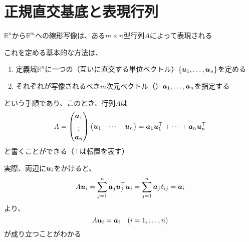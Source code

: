 \documentclass[../../../topic_linear-algebra]{subfiles}
\begin{document}
\sectionline
\section{正規直交基底と表現行列}

$\mathbb{R}^n$から$\mathbb{R}^m$への線形写像は、ある$m \times n$型行列$A$によって表現される

\br

これを定める基本的な方法は、
\begin{enumerate}
  \item 定義域$\mathbb{R}^n$に一つの（互いに直交する単位ベクトル）$\{\vb*{u}_1,\ldots,\vb*{u}_n\}$を定める
  \item それぞれが写像されるべき$m$次元ベクトル（）$\vb*{a}_1,\ldots,\vb*{a}_n$を指定する
\end{enumerate}
という手順であり、このとき、行列$A$は
\begin{equation*}
  A = \begin{pmatrix}
    \vb*{a}_1 \\
    \vdots    \\
    \vb*{a}_n
  \end{pmatrix} \begin{pmatrix}
    \vb*{u}_1 & \cdots & \vb*{u}_n
  \end{pmatrix} = \vb*{a}_1 \vb*{u}_1^\top + \cdots + \vb*{a}_n \vb*{u}_n^\top
\end{equation*}
と書くことができる（$\top$は転置を表す）

\br

実際、両辺に$\vb*{u}_i$をかけると、
\begin{equation*}
  A \vb*{u}_i = \sum_{j=1}^n \vb*{a}_j \vb*{u}_j^\top \vb*{u}_i
  = \sum_{j=1}^n \vb*{a}_j \delta_{ij}
  = \vb*{a}_i
\end{equation*}
より、
\begin{equation*}
  A \vb*{u}_i = \vb*{a}_i \quad (i = 1, \ldots, n)
\end{equation*}
が成り立つことがわかる

\sectionline
\end{document}
